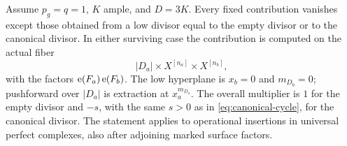 \begin{proposition}\label{prop:fixed-auxiliary}
Assume \(p_g=q=1\), \(K\) ample, and \(D=3K\).
Every fixed contribution vanishes except those obtained
from a low divisor equal to the empty divisor or to the
canonical divisor.  In either surviving case the
contribution is computed on the actual fiber
\[
 |D_a|\times X^{[n_a]}\times X^{[n_b]},
\]
with the factors \(\operatorname{e}(F_a)\operatorname{e}(F_b)\).
The low hyperplane is \(x_b=0\) and \(m_{D_b}=0\);
pushforward over \(|D_a|\) is extraction at
\(x_a^{m_{D_a}}\).
The overall multiplier is \(1\) for the empty divisor and
\(-s\), with the same \(s>0\) as in
\eqref{eq:canonical-cycle}, for the canonical divisor.
The statement applies to operational insertions in
universal perfect complexes, also after adjoining marked
surface factors.
\end{proposition}

